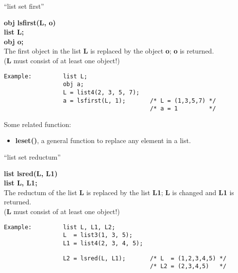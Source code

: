 \newpage

\begin{center} ``list set first'' \end{center}
{\bf obj lsfirst(L, o)\\
list L;\\
obj o;}\\[2ex]
The first object in the list {\bf L} is replaced by the object {\bf o}; {\bf o} is returned.\\
({\bf L} must consist of at least one object!)

\begin{verbatim}
Example:         list L;
                 obj a;
                 L = list4(2, 3, 5, 7);
                 a = lsfirst(L, 1);       /* L = (1,3,5,7) */
                                          /* a = 1         */
\end{verbatim}

Some related function:

\begin{itemize}
\item[] {\bf leset()}, a general function to replace any element in a list.
\end{itemize}

\newpage

\begin{center} ``list set reductum'' \end{center}
{\bf list lsred(L, L1)\\
list L, L1;}\\[2ex]
The reductum of the list {\bf L} is replaced by the list {\bf L1}; {\bf L} is changed
and {\bf L1} is returned.\\
({\bf L} must consist of at least one object!)

\begin{verbatim}
Example:         list L, L1, L2;
                 L  = list3(1, 3, 5);
                 L1 = list4(2, 3, 4, 5);
\end{verbatim}

\vspace*{1.5cm}


\begin{verbatim}
                 L2 = lsred(L, L1);       /* L  = (1,2,3,4,5) */
                                          /* L2 = (2,3,4,5)   */
\end{verbatim}

\vspace*{6.5cm}


